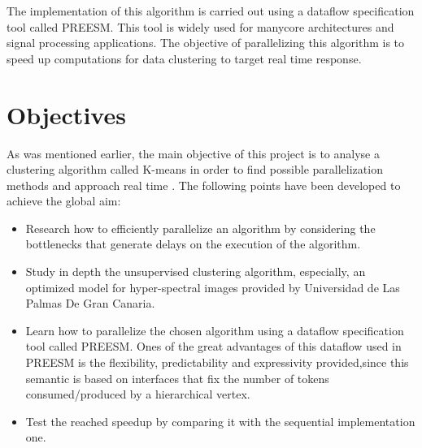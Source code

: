 The implementation of this algorithm is carried out using a dataflow specification tool called PREESM. This tool is widely used for manycore architectures and signal processing applications. The objective of parallelizing this algorithm is to speed up computations for data clustering to target real time response.

    \section{Objectives}
    
As was mentioned earlier, the main objective of this project is to analyse a clustering algorithm called K-means in order to find possible parallelization methods and approach real time . The following points have been developed to achieve the global aim:
 \begin{itemize}
\item  Research how to efficiently parallelize an algorithm by considering the bottlenecks that generate delays on the execution of the algorithm. 
\item Study in depth the unsupervised clustering algorithm, especially, an optimized model for hyper-spectral images provided by Universidad de Las Palmas De Gran Canaria.
\item  Learn how to parallelize the chosen algorithm using a dataflow specification tool called PREESM. Ones of the great advantages of this dataflow used in PREESM is the flexibility, predictability and expressivity provided,since this semantic is based on interfaces that fix the number of tokens consumed/produced by a hierarchical vertex.
\item Test the reached speedup by comparing it with the sequential implementation one.
\end{itemize}
